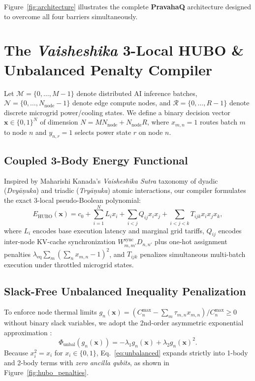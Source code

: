 \documentclass[10pt,twocolumn,letterpaper]{article}
\begin{document}
Figure~\ref{fig:architecture} illustrates the complete \textbf{PravahaQ} architecture designed to overcome all four barriers simultaneously.

\section{The \emph{Vaisheshika} 3-Local HUBO \& Unbalanced Penalty Compiler}
Let $\mathcal{M} = \{0,\dots,M-1\}$ denote distributed AI inference batches, $\mathcal{N} = \{0,\dots,N_{\text{node}}-1\}$ denote edge compute nodes, and $\mathcal{R} = \{0,\dots,R-1\}$ denote discrete microgrid power/cooling states. We define a binary decision vector $\mathbf{x} \in \{0,1\}^N$ of dimension $N = M N_{\text{node}} + N_{\text{node}} R$, where $x_{m,n} = 1$ routes batch $m$ to node $n$ and $y_{n,r} = 1$ selects power state $r$ on node $n$.

\subsection{Coupled 3-Body Energy Functional}
Inspired by Maharishi Kanada's \emph{Vaisheshika Sutra} taxonomy of dyadic (\emph{Dvy\={a}\d{n}uka}) and triadic (\emph{Try\={a}\d{n}uka}) atomic interactions, our compiler formulates the exact 3-local pseudo-Boolean polynomial:
\begin{equation}
    E_{\text{HUBO}}(\mathbf{x}) = c_0 + \sum_{i=1}^{N} L_i x_i + \sum_{i < j} Q_{ij} x_i x_j + \sum_{i < j < k} T_{ijk} x_i x_j x_k,
    \label{eq:hubo}
\end{equation}
where $L_i$ encodes base execution latency and marginal grid tariffs, $Q_{ij}$ encodes inter-node KV-cache synchronization $W_{m,m'}^{\text{sync}} D_{n,n'}$ plus one-hot assignment penalties $\lambda_{\text{eq}} \sum_m (\sum_n x_{m,n} - 1)^2$, and $T_{ijk}$ penalizes simultaneous multi-batch execution under throttled microgrid states.

\subsection{Slack-Free Unbalanced Inequality Penalization}
To enforce node thermal limits $g_n(\mathbf{x}) = (C_n^{\max} - \sum_m \tau_{m,n} x_{m,n}) / C_n^{\max} \ge 0$ without binary slack variables, we adopt the 2nd-order asymmetric exponential approximation \cite{montanez2024unbalanced}:
\begin{equation}
    \Phi_{\text{unbal}}(g_n(\mathbf{x})) = -\lambda_1 g_n(\mathbf{x}) + \lambda_2 g_n(\mathbf{x})^2.
    \label{eq:unbalanced}
\end{equation}
Because $x_i^2 = x_i$ for $x_i \in \{0,1\}$, Eq.~\eqref{eq:unbalanced} expands strictly into 1-body and 2-body terms with \emph{zero ancilla qubits}, as shown in Figure~\ref{fig:hubo_penalties}.
\end{document}
